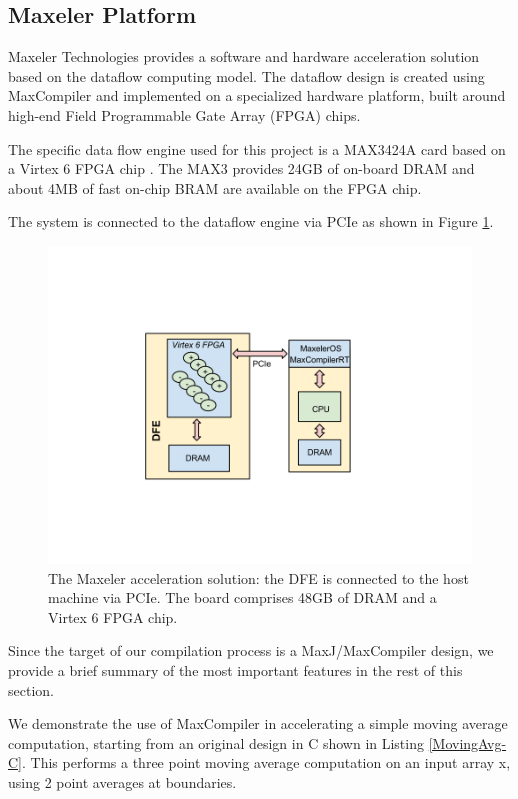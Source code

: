 \subsection{Maxeler Platform}
\label{sec:maxeler-platform}
Maxeler Technologies provides a software and hardware acceleration
solution based on the dataflow computing model. The dataflow design is
created using MaxCompiler \cite{Maxeler} and implemented on a specialized
hardware platform, built around high-end Field Programmable Gate Array
(FPGA) chips.


The specific data flow engine used for this project is a MAX3424A card
based on a Virtex 6 FPGA chip \cite{Virtex6}. The MAX3 provides 24GB of
on-board DRAM and about 4MB of fast on-chip BRAM are available on the
FPGA chip.

The system is connected to the dataflow engine via PCIe as shown in
Figure \ref{fig:max3}.

\begin{figure}[h]
  \centering
  \includegraphics[scale=0.4, trim=0 200 0 200]{figs/max3.png} \caption{
    The Maxeler acceleration solution: the DFE is connected to
    the host machine via PCIe. The board comprises 48GB of DRAM and a
    Virtex 6 FPGA chip. }
  \label{fig:max3}
\end{figure}


Since the target of our compilation process is a MaxJ/MaxCompiler
design, we provide a brief summary of the most important features in
the rest of this section.

We demonstrate the use of MaxCompiler in accelerating a simple moving
average computation, starting from an original design in C shown in
Listing \ref{MovingAvg-C}. This performs a three point moving average
computation on an input array x, using 2 point averages at boundaries.

